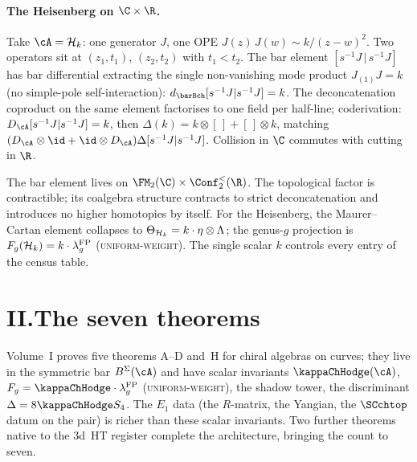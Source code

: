 \paragraph{The Heisenberg on $\C \times \R$.}
Take $\cA = \cH_k$: one generator $J$, one OPE
$J(z)\,J(w) \sim k/(z-w)^2$. Two operators sit at $(z_1, t_1)$,
$(z_2, t_2)$ with $t_1 < t_2$. The bar element
$[s^{-1}J \,|\, s^{-1}J]$ has bar differential extracting the
single non-vanishing mode product $J_{(1)}J = k$ (no simple-pole
self-interaction):
$d_{\barBch}[s^{-1}J | s^{-1}J] = k$. The deconcatenation
coproduct on the same element factorises to one field per
half-line; coderivation:
$D_\cA[s^{-1}J | s^{-1}J] = k$, then
$\Delta(k) = k \otimes [\,] + [\,] \otimes k$, matching
$(D_\cA \otimes \id + \id \otimes D_\cA)\Delta[s^{-1}J | s^{-1}J]$.
Collision in $\C$ commutes with cutting in $\R$.

The bar element lives on
$\FM_2(\C) \times \Conf_2^<(\R)$. The topological factor is
contractible; its coalgebra structure contracts to strict
deconcatenation and introduces no higher homotopies by itself. For the
Heisenberg, the Maurer--Cartan element collapses to
$\Theta_{\mathcal{H}_k} = k \cdot \eta \otimes \Lambda$; the genus-$g$
projection is $F_g(\mathcal{H}_k) = k \cdot \lambda_g^{\mathrm{FP}}$
\textup{(\textsc{uniform-weight})}. The single scalar $k$
controls every entry of the census table.

\section*{II.\quad The seven theorems}

\noindent
Volume~I proves five theorems A--D and~H for chiral algebras on
curves; they live in the symmetric bar $B^\Sigma(\cA)$ and have
scalar invariants $\kappaChHodge(\cA)$,
$F_g = \kappaChHodge\cdot\lambda_g^{\mathrm{FP}}$
\textup{(\textsc{uniform-weight})}, the shadow tower, the
discriminant $\Delta = 8\kappaChHodge S_4$. The $E_1$
data (the $R$-matrix, the Yangian, the $\SCchtop$ datum on the
pair) is richer than these scalar invariants. Two further theorems
native to the 3d~HT register complete the architecture, bringing
the count to seven.


